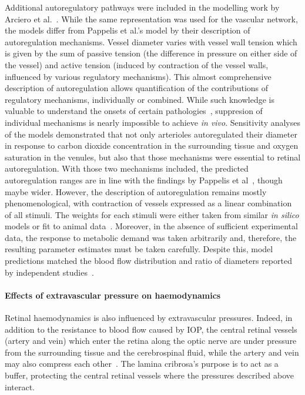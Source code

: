\documentclass{article}
\begin{document}
Additional autoregulatory pathways were included in the modelling work by Arciero et al.~\cite{Arciero_2008,Arciero_2013}.
While the same representation was used for the vascular network, the models differ from Pappelis et al.'s model by their description of autoregulation mechanisms.
Vessel diameter varies with vessel wall tension which is given by the sum of passive tension (the difference in pressure on either side of the vessel) and active tension (induced by contraction of the vessel walls, influenced by various regulatory mechanisms).
This almost comprehensive description of autoregulation allows quantification of the contributions of regulatory mechanisms, individually or combined.
While such knowledge is valuable to understand the onsets of certain pathologies~\cite{Arciero_2013}, suppresion of individual mechanisms is nearly impossible to achieve \textit{in vivo}.
Sensitivity analyses of the models demonstrated that not only arterioles autoregulated their diameter in response to carbon dioxide concentration in the surrounding tissue and oxygen saturation in the venules, but also that those mechanisms were essential to retinal autoregulation.
With those two mechanisms included, the predicted autoregulation ranges are in line with the findings by Pappelis et al~\cite{Pappelis_2020}, though maybe wider. 
However, the description of autoregulation remains mostly phenomenological, with contraction of vessels expressed as a linear combination of all stimuli.
The weights for each stimuli were either taken from similar \textit{in silico} models or fit to animal data~\cite{Arciero_2013}.
Moreover, in the absence of sufficient experimental data, the response to metabolic demand was taken arbitrarily and, therefore, the resulting parameter estimates must be taken carefully.
Despite this, model predictions matched the blood flow distribution and ratio of diameters reported by independent studies~\cite{Arciero_2013}.

\paragraph*{Effects of extravascular pressure on haemodynamics} %

Retinal haemodynamics is also influenced by extravascular pressures.
Indeed, in addition to the resistance to blood flow caused by IOP, the central retinal vessels (artery and vein) which enter the retina along the optic nerve are under pressure from the surrounding tissue and the cerebrospinal fluid, while the artery and vein may also compress each other~\cite{Nickells_2012}.
The lamina cribrosa's purpose is to act as a buffer, protecting the central retinal vessels where the pressures described above interact.
\end{document}
